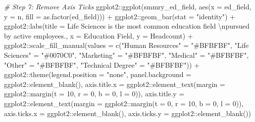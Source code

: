 \documentclass[
]{book}
\newenvironment{Shaded}{\begin{snugshade}}{\end{snugshade}}
\newcommand{\AttributeTok}[1]{\textcolor[rgb]{0.77,0.63,0.00}{#1}}
\newcommand{\CommentTok}[1]{\textcolor[rgb]{0.56,0.35,0.01}{\textit{#1}}}
\newcommand{\DecValTok}[1]{\textcolor[rgb]{0.00,0.00,0.81}{#1}}
\newcommand{\FunctionTok}[1]{\textcolor[rgb]{0.00,0.00,0.00}{#1}}
\newcommand{\NormalTok}[1]{#1}
\newcommand{\OtherTok}[1]{\textcolor[rgb]{0.56,0.35,0.01}{#1}}
\newcommand{\SpecialCharTok}[1]{\textcolor[rgb]{0.00,0.00,0.00}{#1}}
\newcommand{\StringTok}[1]{\textcolor[rgb]{0.31,0.60,0.02}{#1}}
\begin{document}
\begin{Shaded}
\begin{Highlighting}[]
\CommentTok{\# Step 7: Remove Axis Ticks}
\NormalTok{ggplot2}\SpecialCharTok{::}\FunctionTok{ggplot}\NormalTok{(smmry\_ed\_field, }\FunctionTok{aes}\NormalTok{(}\AttributeTok{x =}\NormalTok{ ed\_field, }\AttributeTok{y =}\NormalTok{ n, }\AttributeTok{fill =} \FunctionTok{as.factor}\NormalTok{(ed\_field))) }\SpecialCharTok{+}
\NormalTok{ggplot2}\SpecialCharTok{::}\FunctionTok{geom\_bar}\NormalTok{(}\AttributeTok{stat =} \StringTok{"identity"}\NormalTok{) }\SpecialCharTok{+}
\NormalTok{ggplot2}\SpecialCharTok{::}\FunctionTok{labs}\NormalTok{(}\AttributeTok{title =} \StringTok{\textquotesingle{}Life Sciences is the most common education field }\SpecialCharTok{\textbackslash{}n}\StringTok{pursued by active employees.\textquotesingle{}}\NormalTok{, }\AttributeTok{x =} \StringTok{\textquotesingle{}Education Field\textquotesingle{}}\NormalTok{, }\AttributeTok{y =} \StringTok{\textquotesingle{}Headcount\textquotesingle{}}\NormalTok{) }\SpecialCharTok{+}
\NormalTok{ggplot2}\SpecialCharTok{::}\FunctionTok{scale\_fill\_manual}\NormalTok{(}\AttributeTok{values =} \FunctionTok{c}\NormalTok{(}\StringTok{"Human Resources"} \OtherTok{=} \StringTok{"\#BFBFBF"}\NormalTok{, }
                                      \StringTok{"Life Sciences"} \OtherTok{=} \StringTok{"\#0070C0"}\NormalTok{, }
                                      \StringTok{"Marketing"} \OtherTok{=} \StringTok{"\#BFBFBF"}\NormalTok{, }
                                      \StringTok{"Medical"} \OtherTok{=} \StringTok{"\#BFBFBF"}\NormalTok{,}
                                      \StringTok{"Other"} \OtherTok{=} \StringTok{"\#BFBFBF"}\NormalTok{,}
                                      \StringTok{"Technical Degree"} \OtherTok{=} \StringTok{"\#BFBFBF"}\NormalTok{)) }\SpecialCharTok{+}
\NormalTok{ggplot2}\SpecialCharTok{::}\FunctionTok{theme}\NormalTok{(}\AttributeTok{legend.position =} \StringTok{"none"}\NormalTok{,}
               \AttributeTok{panel.background =}\NormalTok{ ggplot2}\SpecialCharTok{::}\FunctionTok{element\_blank}\NormalTok{(),}
               \AttributeTok{axis.title.x =}\NormalTok{ ggplot2}\SpecialCharTok{::}\FunctionTok{element\_text}\NormalTok{(}\AttributeTok{margin =}\NormalTok{ ggplot2}\SpecialCharTok{::}\FunctionTok{margin}\NormalTok{(}\AttributeTok{t =} \DecValTok{10}\NormalTok{, }\AttributeTok{r =} \DecValTok{0}\NormalTok{, }\AttributeTok{b =} \DecValTok{0}\NormalTok{, }\AttributeTok{l =} \DecValTok{0}\NormalTok{)),}
               \AttributeTok{axis.title.y =}\NormalTok{ ggplot2}\SpecialCharTok{::}\FunctionTok{element\_text}\NormalTok{(}\AttributeTok{margin =}\NormalTok{ ggplot2}\SpecialCharTok{::}\FunctionTok{margin}\NormalTok{(}\AttributeTok{t =} \DecValTok{0}\NormalTok{, }\AttributeTok{r =} \DecValTok{10}\NormalTok{, }\AttributeTok{b =} \DecValTok{0}\NormalTok{, }\AttributeTok{l =} \DecValTok{0}\NormalTok{)),}
               \AttributeTok{axis.ticks.x =}\NormalTok{ ggplot2}\SpecialCharTok{::}\FunctionTok{element\_blank}\NormalTok{(),}
               \AttributeTok{axis.ticks.y =}\NormalTok{ ggplot2}\SpecialCharTok{::}\FunctionTok{element\_blank}\NormalTok{())}


\end{Highlighting}
\end{Shaded}
\end{document}
